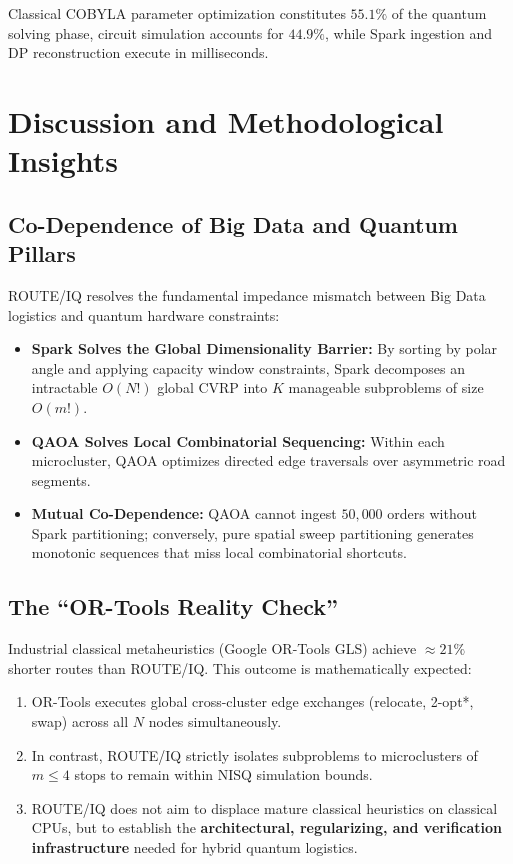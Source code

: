 \documentclass[journal,10pt]{IEEEtran}
\begin{document}
Classical COBYLA parameter optimization constitutes $55.1\%$ of the quantum solving phase, circuit simulation accounts for $44.9\%$, while Spark ingestion and DP reconstruction execute in milliseconds.

\section{Discussion and Methodological Insights}

\subsection{Co-Dependence of Big Data and Quantum Pillars}
ROUTE/IQ resolves the fundamental impedance mismatch between Big Data logistics and quantum hardware constraints:
\begin{itemize}
    \item \textbf{Spark Solves the Global Dimensionality Barrier:} By sorting by polar angle and applying capacity window constraints, Spark decomposes an intractable $O(N!)$ global CVRP into $K$ manageable subproblems of size $O(m!)$.
    \item \textbf{QAOA Solves Local Combinatorial Sequencing:} Within each microcluster, QAOA optimizes directed edge traversals over asymmetric road segments.
    \item \textbf{Mutual Co-Dependence:} QAOA cannot ingest $50,000$ orders without Spark partitioning; conversely, pure spatial sweep partitioning generates monotonic sequences that miss local combinatorial shortcuts.
\end{itemize}

\subsection{The ``OR-Tools Reality Check''}
Industrial classical metaheuristics (Google OR-Tools GLS) achieve $\approx 21\%$ shorter routes than ROUTE/IQ. This outcome is mathematically expected:
\begin{enumerate}
    \item OR-Tools executes global cross-cluster edge exchanges (relocate, 2-opt*, swap) across all $N$ nodes simultaneously.
    \item In contrast, ROUTE/IQ strictly isolates subproblems to microclusters of $m \le 4$ stops to remain within NISQ simulation bounds.
    \item ROUTE/IQ does not aim to displace mature classical heuristics on classical CPUs, but to establish the \textbf{architectural, regularizing, and verification infrastructure} needed for hybrid quantum logistics.
\end{enumerate}
\end{document}
